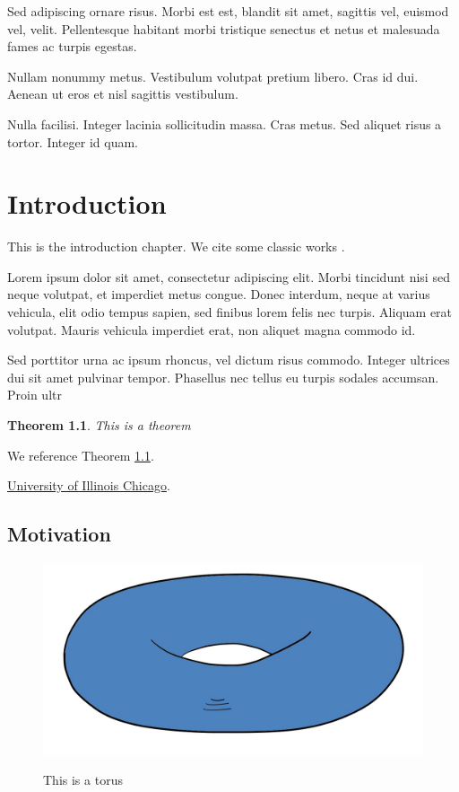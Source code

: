 \documentclass[12pt,reqno,oneside]{amsbook}
\newtheorem{theorem}{Theorem}[chapter]
\theoremstyle{definition}
\begin{document}
Sed adipiscing ornare risus. Morbi est est, blandit sit amet, sagittis vel, euismod vel, velit. Pellentesque habitant morbi tristique senectus et netus et malesuada fames ac turpis egestas.

Nullam nonummy metus. Vestibulum volutpat pretium libero. Cras id dui. Aenean ut eros et nisl sagittis vestibulum.

Nulla facilisi. Integer lacinia sollicitudin massa. Cras metus. Sed aliquet risus a tortor. Integer id quam.



\mainmatter

\doublespacing %

\chapter{Introduction}
This is the introduction chapter. We cite some classic works \cite{Hartshorne,Mumford}.  

Lorem ipsum dolor sit amet, consectetur adipiscing elit. Morbi tincidunt nisi sed neque volutpat, et imperdiet metus congue. Donec interdum, neque at varius vehicula, elit odio tempus sapien, sed finibus lorem felis nec turpis. Aliquam erat volutpat. Mauris vehicula imperdiet erat, non aliquet magna commodo id.

Sed porttitor urna ac ipsum rhoncus, vel dictum risus commodo. Integer ultrices dui sit amet pulvinar tempor. Phasellus nec tellus eu turpis sodales accumsan. Proin ultr


\begin{theorem}\label{thm1}
This is a theorem
\end{theorem}

We reference Theorem \ref{thm1}.

\href{https://www.uic.edu}{University of Illinois Chicago}.

\section{Motivation}


\begin{figure}\label{fig1}
\includegraphics[alt="Description of Image that serves the same purpose",scale=0.3]{torus.jpg}
\caption{This is a torus}
\end{figure}
\end{document}
